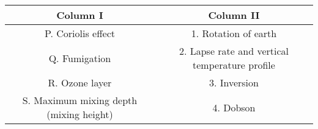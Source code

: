 \begin{tabular}[12pt]{ |c| c|}
    \hline
    \textbf{Column I} & \textbf{Column II}\\ 
    \hline
    P. Coriolis effect & 1. Rotation of earth \\
    \hline 
    Q. Fumigation & 2. Lapse rate and vertical temperature profile \\
    \hline
    R. Ozone layer & 3. Inversion \\
    \hline
    S. Maximum mixing depth (mixing height) & 4. Dobson\\
    \hline
    \end{tabular}

